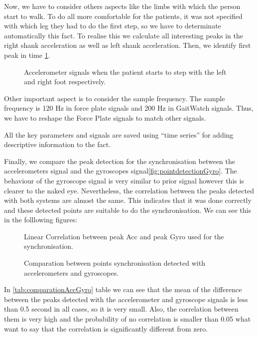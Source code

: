 Now, we have to consider others aspects like the limbs with which the person start to walk. To do all more comfortable for the patients, it was not specified with which leg they had to do the first step, so we have to determinate automatically this fact. To realise this we calculate all interesting peaks in the right shank acceleration as well as left shank acceleration. Then, we identify first peak in time \ref{fig:startLeftRight}.

\begin{figure}[H]
	\centering
	\caption{Accelerometer signals when the patient starts to step with the left and right foot respectively.}
	\label{fig:startLeftRight}
\end{figure} 

Other important aspect is to consider the sample frequency. The sample frequency is 120 Hz in force plate signals and 200 Hz in GaitWatch signals. Thus, we have to reshape the Force Plate signals to match other signals.

All the key parameters and signals are saved using “time series”  for adding descriptive information to the fact.

Finally, we compare the peak detection for the synchronisation between the accelerometers signal and the gyroscopes signal\ref{fig:pointdetectionGyro}. The behaviour of the gyroscope signal is very similar to prior signal however this is clearer to the naked eye.
Nevertheless, the correlation between the peaks detected with both systems are almost the same. This indicates that it was done correctly and these detected points are suitable to do the synchronisation. We can see this in the folllowing figures:

\begin{figure}[H]
	\centering
	\caption{Linear Correlation between peak Acc and peak Gyro used for the synchronisation.}
	\label{fig:corrAccGyroPoints}
\end{figure}

\begin{figure}[H]
	\centering
	\caption{Comparation between points synchronisation detected with accelerometers and gyroscopes.}
	\label{fig:barDiagram}
\end{figure}


In \ref{tab:comparationAccGyro} table we can see that the mean of the difference between the peaks detected with the accelerometer and gyroscope signals is less than 0.5 second in all cases, so it is very small. Also, the correlation between them is very high and the probability of no correlation is smaller than 0.05 what want to say that the correlation is significantly different from zero.


